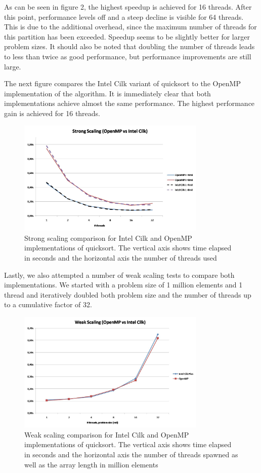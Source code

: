 \documentclass[]{scrartcl}
\begin{document}
As can be seen in figure 2, the highest speedup is achieved for 16 threads. After this point, performance levels off and a steep decline is visible for 64 threads. This is due to the additional overhead, since the maximum number of threads for this partition has been exceeded. 
Speedup seems to be slightly better for larger problem sizes. It should also be noted that doubling the number of threads leads to less than twice as good performance, but performance improvements are still large.

The next figure compares the Intel Cilk variant of quicksort to the OpenMP implementation of the algorithm. It is immediately clear that both implementations achieve almost the same performance. The highest performance gain is achieved for 16 threads.

\begin{figure}[hb]
	\centering
	\includegraphics[width=0.8\textwidth]{quick_strong_scaling2}
	\caption{Strong scaling comparison for Intel Cilk and OpenMP implementations of quicksort. The vertical axis shows time elapsed in seconds and the horizontal axis the number of threads used}
\end{figure}


Lastly, we also attempted a number of weak scaling tests to compare both implementations. We started with a problem size of 1 million elements and 1 thread and iteratively doubled both problem size and the number of threads up to a cumulative factor of 32.

\begin{figure}[h!]
	\centering
	\includegraphics[width=0.8\textwidth]{quick_weak_scaling}
	\caption{Weak scaling comparison for Intel Cilk and OpenMP implementations of quicksort. The vertical axis shows time elapsed in seconds and the horizontal axis the number of threads spawned as well as the array length in million elements}
\end{figure}
\end{document}
